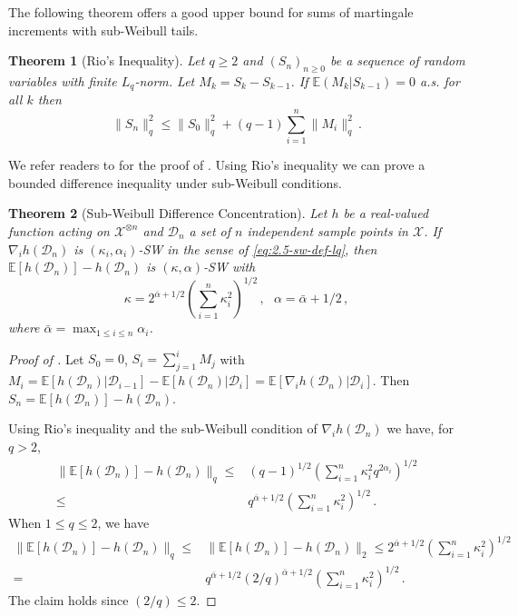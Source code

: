 \documentclass[11pt]{article}
\theoremstyle{plain}
\newtheorem{theorem}{Theorem}[section]
\newcommand{\D}{{\mathcal{D}}}
\newcommand{\X}{{\mathcal{X}}}
\begin{document}
The following theorem offers a good upper bound for sums of martingale increments with sub-Weibull tails.
\begin{theorem}[Rio's Inequality]\label{thm:rio}
    Let $q\ge 2$ and $(S_n)_{n\ge 0}$ be a sequence of random variables with finite $L_q$-norm.
    Let $M_k=S_k-S_{k-1}$. If $\mathbb E(M_k|S_{k-1})=0$ a.s. for all $k$ then
    $$
    \|S_n\|_q^2\le \|S_0\|_q^2+(q-1)\sum_{i=1}^n\|M_i\|_q^2\,.
    $$
\end{theorem}
We refer readers to \cite{rio2009moment} for the proof of . Using Rio's inequality we can prove a bounded difference inequality under sub-Weibull conditions.
\begin{theorem}[Sub-Weibull Difference Concentration]\label{thm:2.5-sw-mcdiarmid}
Let $h$ be a real-valued function acting on $\X^{\otimes n}$ and $\D_n$ a set of $n$ independent sample points in $\X$.
    If $\nabla_i h(\D_n)$ is $(\kappa_i,\alpha_i)$-SW in the sense of \eqref{eq:2.5-sw-def-lq}, then 
    $\mathbb E[h(\D_n)]-h(\D_n)$ is $(\kappa,\alpha)$-SW with
    $$\kappa=2^{\bar\alpha+1/2}\left(\sum_{i=1}^n\kappa_i^2\right)^{1/2}\,,~~~\alpha = \bar\alpha+1/2\,,$$
    where $\bar\alpha=\max_{1\le i\le n}\alpha_i$.
\end{theorem}
\begin{proof}[Proof of ]
    Let $S_0=0$, $S_i=\sum_{j=1}^i M_j$ with $M_i=\mathbb E[ h(\D_n) |\D_{i-1}]-\mathbb E[h(\D_n)|\D_i]=\mathbb E[\nabla_i h(\D_n)|\D_i]$.
    Then $S_n=\mathbb E[h(\D_n)]-h(\D_n)$.

    Using Rio's inequality and the sub-Weibull condition of $\nabla_i h(\D_n)$ we have, for $q>2$,
    \begin{align*}
        \|\mathbb E[h(\D_n)]-h(\D_n)\|_q\le & (q-1)^{1/2}\left(\sum_{i=1}^n \kappa_i^2 q^{2\alpha_i}\right)^{1/2}\\
        \le & q^{\bar\alpha+1/2} \left(\sum_{i=1}^n \kappa_i^2\right)^{1/2}\,.
    \end{align*}
    When $1\le q\le 2$, we have
    \begin{align*}
        \|\mathbb E[h(\D_n)]-h(\D_n)\|_q\le& \|\mathbb E[h(\D_n)]-h(\D_n)\|_2\le 2^{\bar\alpha+1/2} \left(\sum_{i=1}^n \kappa_i^2\right)^{1/2}\\
        =&q^{\bar\alpha+1/2}(2/q)^{\bar\alpha+1/2} \left(\sum_{i=1}^n \kappa_i^2\right)^{1/2}\,.
    \end{align*}
    The claim holds since $(2/q)\le 2$.
\end{proof}
\end{document}
